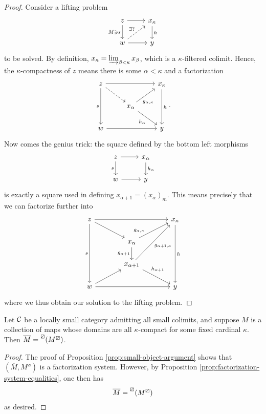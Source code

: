 \begin{proof}
Consider a lifting problem
\[
	\begin{tikzcd}
		z\ar[d,"M \ni s"']\ar[r] & x_\kappa\ar[d,"h"] \\
		w\ar[r]\ar[ur,dashed,"\exists?"] & y
	\end{tikzcd}
\]
to be solved. By definition, \(x_\kappa = \injlim_{\beta < \kappa}x_\beta\), which is a \(\kappa\)-filtered colimit. Hence, the \(\kappa\)-compactness of \(z\) means there is some
\(\alpha < \kappa\) and a factorization
\[
	\begin{tikzcd}
		z\ar[dd,"s"']\ar[rr]\ar[dr,dashed] & & x_\kappa\ar[dd,"h"] \\
		& x_\alpha\ar[dr,"h_\alpha"']\ar[ur,"g_{\alpha,\kappa}"' near start] & \\
		w\ar[rr] & & y
	\end{tikzcd}.
\]
Now comes the genius trick: the square defined by the bottom left morphisms
\[
	\begin{tikzcd}
		z\ar[d,"s"']\ar[r] & x_\alpha \ar[d,"h_\alpha"] \\
		w \ar[r] & y
	\end{tikzcd}
\]
is exactly a square used in defining \(x_{\alpha+1} = (x_{\alpha})_m\). This means precisely that we can factorize further into
\[
	\begin{tikzcd}[column sep=large]
		z\ar[ddd,"s"']\ar[rr]\ar[dr] & & x_\kappa\ar[ddd,"h"] \\
		& x_\alpha\ar[d,"g_{\alpha+1}"']\ar[ur,"g_{\alpha,\kappa}" near start] & \\
		& x_{\alpha+1}\ar[dr,"h_{\alpha+1}" near start]\ar[uur,"g_{\alpha+1,\kappa}"'] & \\
		w\ar[rr]\ar[ur] & & y
	\end{tikzcd}
\]
where we thus obtain our solution to the lifting problem.
\end{proof}
\begin{corollary}
	Let \(\calC\) be a locally small category admitting all small colimits, and suppose \(M\) is a collection of maps whose domains are all \(\kappa\)-compact for some fixed cardinal \(\kappa\).
	Then \(\overline{M} = \prescript{\boxslash}{}{(M^\boxslash)}\).
\end{corollary}
\begin{proof}
The proof of Proposition \ref{prop:small-object-argument} shows that \((\overline{M},M^\boxslash)\) is a factorization system. However, by Proposition \ref{prop:factorization-system-equalities},
one then has
\[ \overline{M} = \prescript{\boxslash}{}{(M^\boxslash)} \]
as desired.
\end{proof}
